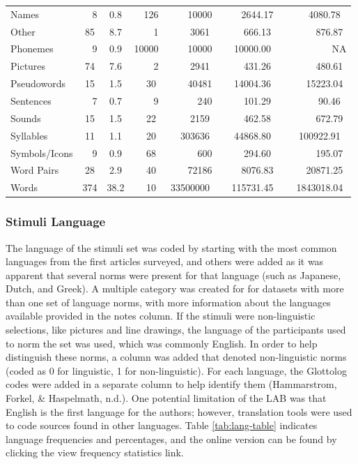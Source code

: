 \documentclass[english,,man]{apa6}
\theoremstyle{definition}
\theoremstyle{definition}
\theoremstyle{definition}
\theoremstyle{remark}
\begin{document}
\begin{table}[tbp]
\begin{center}
\begin{threeparttable}
{\begin{tabular}{lcccccc}
Names & \ \ 8 & 0.8 & \ \ 126 & \ \ \ \ 10000 & \ \ \ \ 2644.17 & \ \ \ \  4080.78\\
Other & 85 & 8.7 & \ \ \ \ 1 & \ \ \ \  3061 & \ \ \ \  666.13 & \ \ \ \ \ \ 876.87\\
Phonemes & \ \ 9 & 0.9 & 10000 & \ \ \ \ 10000 & \ \  10000.00 & \ \ \ \ \ \ \ \ \ \ NA\\
Pictures & 74 & 7.6 & \ \ \ \ 2 & \ \ \ \  2941 & \ \ \ \  431.26 & \ \ \ \ \ \ 480.61\\
Pseudowords & 15 & 1.5 & \ \  30 & \ \ \ \ 40481 & \ \  14004.36 & \ \ \ \ 15223.04\\
Sentences & \ \ 7 & 0.7 & \ \ \ \ 9 & \ \ \ \ \ \ 240 & \ \ \ \  101.29 & \ \ \ \ \ \  90.46\\
Sounds & 15 & 1.5 & \ \  22 & \ \ \ \  2159 & \ \ \ \  462.58 & \ \ \ \ \ \ 672.79\\
Syllables & 11 & 1.1 & \ \  20 & \ \  303636 & \ \  44868.80 & \ \  100922.91\\
Symbols/Icons & \ \ 9 & 0.9 & \ \  68 & \ \ \ \ \ \ 600 & \ \ \ \  294.60 & \ \ \ \ \ \ 195.07\\
Word Pairs & 28 & 2.9 & \ \  40 & \ \ \ \ 72186 & \ \ \ \ 8076.83 & \ \ \ \ 20871.25\\
Words & 374 & 38.2 & \ \  10 & 33500000 & \ \ 115731.45 & \ \ 1843018.04\\
\bottomrule
\end{tabular}
}
\end{threeparttable}
\end{center}
\end{table}

\hypertarget{stimuli-language}{%
\subsubsection{Stimuli Language}\label{stimuli-language}}

The language of the stimuli set was coded by starting with the most
common languages from the first articles surveyed, and others were added
as it was apparent that several norms were present for that language
(such as Japanese, Dutch, and Greek). A multiple category was created
for for datasets with more than one set of language norms, with more
information about the languages available provided in the notes column.
If the stimuli were non-linguistic selections, like pictures and line
drawings, the language of the participants used to norm the set was
used, which was commonly English. In order to help distinguish these
norms, a column was added that denoted non-linguistic norms (coded as 0
for linguistic, 1 for non-linguistic). For each language, the Glottolog
codes were added in a separate column to help identify them
(Hammarstrom, Forkel, \& Haspelmath, n.d.). One potential limitation of
the LAB was that English is the first language for the authors; however,
translation tools were used to code sources found in other languages.
Table \ref{tab:lang-table} indicates language frequencies and
percentages, and the online version can be found by clicking the view
frequency statistics link.
\end{document}
